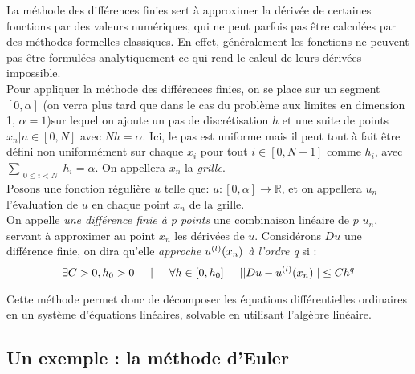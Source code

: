 \documentclass[12pt]{article}
\newcommand{\R}{\mathbb R}
\begin{document}
\quad La méthode des différences finies sert à approximer la dérivée de certaines fonctions par des valeurs numériques, qui ne peut parfois pas être calculées par des méthodes formelles classiques. En effet, généralement les fonctions ne peuvent pas être formulées analytiquement ce qui rend le calcul de leurs dérivées impossible.
\\
\quad Pour appliquer la méthode des différences finies, on se place sur un segment $[0, \alpha]$ (on verra plus tard que dans le cas du problème aux limites en dimension 1, $\alpha = 1$)sur lequel on ajoute un pas de discrétisation $h$ et une suite de points $x_n | n\in [0, N]$ avec $Nh = \alpha$. Ici, le pas est uniforme mais il peut tout à fait être défini non uniformément sur chaque $x_i$ pour tout $i \in [0, N-1]$ comme $h_i$, avec $\sum_{\substack{0 \le i< N}}h_i = \alpha$. On appellera $x_n$ la \emph{grille}.
\\
\quad Posons une fonction régulière $u$ telle que: $u : [0, \alpha] \longrightarrow \R$, et on appellera $u_n$ l'évaluation de $u$ en chaque point $x_n$ de la grille. \\
On appelle \emph{une différence finie à p points} une combinaison linéaire de $p$ $u_n$, servant à approximer au point $x_n$ les dérivées de $u$. Considérons $Du$ une différence finie, on dira qu'elle \emph{approche $u^{(l)}\relax(x_n)$ à l'ordre q} si :
\begin{equation}
\exists C>0, h_0 >0 \hspace{5mm}|\hspace{5mm} \forall h \in [0, h_0] \hspace{5mm} ||Du - u^{(l)}\relax(x_n)|| \le Ch^q
\end{equation}





\quad Cette méthode permet donc de décomposer les équations différentielles ordinaires en un système d'équations linéaires, solvable en utilisant l'algèbre linéaire.

\subsection{Un exemple : la méthode d'Euler}
\end{document}
